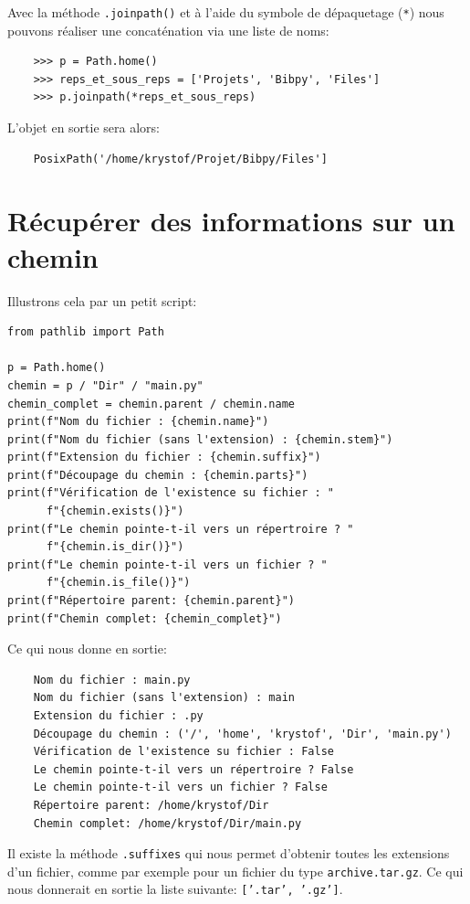 \documentclass[a4paper,12pt]{book}
\begin{document}
Avec la méthode \texttt{.joinpath()} et à l'aide du symbole de dépaquetage (\texttt{*}) nous pouvons réaliser une concaténation via une liste de noms:
\begin{verbatim}
    >>> p = Path.home()
    >>> reps_et_sous_reps = ['Projets', 'Bibpy', 'Files']
    >>> p.joinpath(*reps_et_sous_reps)
\end{verbatim}
\medskip

L'objet en sortie sera alors:
\begin{verbatim}
    PosixPath('/home/krystof/Projet/Bibpy/Files']
\end{verbatim}
\medskip

\section{Récupérer des informations sur un chemin}
Illustrons cela par un petit script:
\begin{lstlisting}[caption=Script avec recueils d'informations]
from pathlib import Path

p = Path.home()
chemin = p / "Dir" / "main.py"
chemin_complet = chemin.parent / chemin.name
print(f"Nom du fichier : {chemin.name}")
print(f"Nom du fichier (sans l'extension) : {chemin.stem}")
print(f"Extension du fichier : {chemin.suffix}")
print(f"Découpage du chemin : {chemin.parts}")
print(f"Vérification de l'existence su fichier : "
      f"{chemin.exists()}")
print(f"Le chemin pointe-t-il vers un répertroire ? "
      f"{chemin.is_dir()}")
print(f"Le chemin pointe-t-il vers un fichier ? "
      f"{chemin.is_file()}")
print(f"Répertoire parent: {chemin.parent}")
print(f"Chemin complet: {chemin_complet}")
\end{lstlisting}
\medskip

Ce qui nous donne en sortie:
\begin{verbatim}
    Nom du fichier : main.py
    Nom du fichier (sans l'extension) : main
    Extension du fichier : .py
    Découpage du chemin : ('/', 'home', 'krystof', 'Dir', 'main.py')
    Vérification de l'existence su fichier : False
    Le chemin pointe-t-il vers un répertroire ? False
    Le chemin pointe-t-il vers un fichier ? False
    Répertoire parent: /home/krystof/Dir
    Chemin complet: /home/krystof/Dir/main.py
\end{verbatim}
\medskip

Il existe la méthode \texttt{.suffixes} qui nous permet d'obtenir toutes les extensions d'un fichier, comme par exemple pour un fichier du type \texttt{archive.tar.gz}. Ce qui nous donnerait en sortie la liste suivante: \texttt{['.tar', '.gz']}.
\medskip
\end{document}
